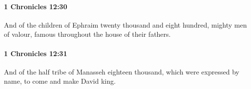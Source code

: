 		\paragraph{1 Chronicles 12:30} %
			\label{1CHRONICLES-12-30}

			And of the children of Ephraim twenty thousand and eight hundred, mighty men of valour, famous throughout the house of their fathers.


		\paragraph{1 Chronicles 12:31} %
			\label{1CHRONICLES-12-31}

			And of the half tribe of Manasseh eighteen thousand, which were expressed by name, to come and make David king.


